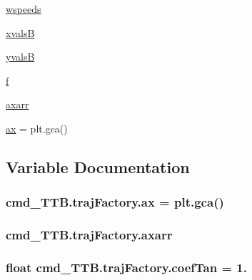 \begin{DoxyCompactItemize}
\item 
\hyperlink{namespacecmd__TTB_1_1trajFactory_a3d3e3185576a4d8c1f41771d38dae565}{wspeeds}
\item 
\hyperlink{namespacecmd__TTB_1_1trajFactory_a9d34c2505734ce41d485698c66d3af36}{xvalsB}
\item 
\hyperlink{namespacecmd__TTB_1_1trajFactory_a445a9f003e3be237b7176463d2ae0ca8}{yvalsB}
\item 
\hyperlink{namespacecmd__TTB_1_1trajFactory_a4eb9c241c592b3fbf3c824c82e0397d4}{f}
\item 
\hyperlink{namespacecmd__TTB_1_1trajFactory_aa4dac444c1fe3126aca359b6d54026dc}{axarr}
\item 
\hyperlink{namespacecmd__TTB_1_1trajFactory_a9b3b7658cef42597751a680874ba240a}{ax} = plt.\+gca()
\end{DoxyCompactItemize}


\subsection{Variable Documentation}
\subsubsection[{\texorpdfstring{ax}{ax}}]{\setlength{\rightskip}{0pt plus 5cm}cmd\+\_\+\+T\+T\+B.\+traj\+Factory.\+ax = plt.\+gca()}\hypertarget{namespacecmd__TTB_1_1trajFactory_a9b3b7658cef42597751a680874ba240a}{}\label{namespacecmd__TTB_1_1trajFactory_a9b3b7658cef42597751a680874ba240a}
\subsubsection[{\texorpdfstring{axarr}{axarr}}]{\setlength{\rightskip}{0pt plus 5cm}cmd\+\_\+\+T\+T\+B.\+traj\+Factory.\+axarr}\hypertarget{namespacecmd__TTB_1_1trajFactory_aa4dac444c1fe3126aca359b6d54026dc}{}\label{namespacecmd__TTB_1_1trajFactory_aa4dac444c1fe3126aca359b6d54026dc}
\subsubsection[{\texorpdfstring{coef\+Tan}{coefTan}}]{\setlength{\rightskip}{0pt plus 5cm}float cmd\+\_\+\+T\+T\+B.\+traj\+Factory.\+coef\+Tan = 1.}\hypertarget{namespacecmd__TTB_1_1trajFactory_a31f0c63eecd9cb034f7db3c30fc94a1b}{}\label{namespacecmd__TTB_1_1trajFactory_a31f0c63eecd9cb034f7db3c30fc94a1b}
